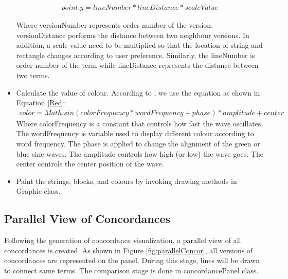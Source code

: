 \begin{itemize}
	\begin{multline}\label{PointY}
	point.y= lineNumber*lineDistance*scaleValue
	\end{multline}
	
	Where versionNumber represents order number of the version. versionDistance performs the  distance between two neighbour versions. In addition, a scale value need to be multiplied so that the location of string and rectangle changes according to user preference.
	Similarly, the lineNumber is order number of the term while lineDistance represents the distance between two terms. 
	
	\item \textbf{}Calculate the value of colour. According to \cite{Jbum}, we use the equation as shown in Equation \eqref{Red}: 	
	\begin{multline}\label{Red}
	color = Math.sin(colorFrequency*wordFrequency + phase) * amplitude + center
	\end{multline}
	Where colorFrequency is a constant that controls how fast the wave oscillates. The wordFrequency is  variable used to display different colour according to word frequency. The phase is applied to change the alignment of the green or blue sine waves. The amplitude controls how high (or low) the wave goes. The center controls the center position of the wave.
	
	\item \textbf{}Paint the strings, blocks, and colours by invoking drawing methods in Graphic class. 
	
\end{itemize}

\subsection{Parallel View of Concordances}

Following the generation of concordance visualization, a parallel view of all concordances is created. As shown in Figure \ref{fig:parallelConcor}, all versions of concordances are represented on the panel. During this stage, lines will be drawn to connect same terms. The comparison stage is done in concordancePanel class. 

